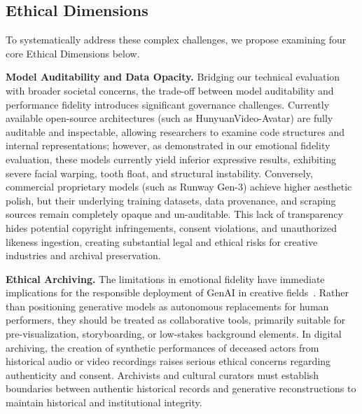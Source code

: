 \documentclass[pdflatex,sn-mathphys-num]{sn-jnl}
\theoremstyle{thmstyleone}
\theoremstyle{thmstyletwo}
\theoremstyle{thmstylethree}
\begin{document}
\subsection{Ethical Dimensions}

To systematically address these complex challenges, we propose examining four core Ethical Dimensions below.

\textbf{Model Auditability and Data Opacity.} Bridging our technical evaluation with broader societal concerns, the trade-off between model auditability and performance fidelity introduces significant governance challenges. Currently available open-source architectures (such as HunyuanVideo-Avatar) are fully auditable and inspectable, allowing researchers to examine code structures and internal representations; however, as demonstrated in our emotional fidelity evaluation, these models currently yield inferior expressive results, exhibiting severe facial warping, tooth float, and structural instability. Conversely, commercial proprietary models (such as Runway Gen-3) achieve higher aesthetic polish, but their underlying training datasets, data provenance, and scraping sources remain completely opaque and un-auditable. This lack of transparency hides potential copyright infringements, consent violations, and unauthorized likeness ingestion, creating substantial legal and ethical risks for creative industries and archival preservation.

\textbf{Ethical Archiving.} The limitations in emotional fidelity have immediate implications for the responsible deployment of GenAI in creative fields~\cite{braid2024responsible}. Rather than positioning generative models as autonomous replacements for human performers, they should be treated as collaborative tools, primarily suitable for pre-visualization, storyboarding, or low-stakes background elements. In digital archiving, the creation of synthetic performances of deceased actors from historical audio or video recordings raises serious ethical concerns regarding authenticity and consent. Archivists and cultural curators must establish boundaries between authentic historical records and generative reconstructions to maintain historical and institutional integrity.
\end{document}
